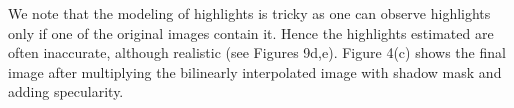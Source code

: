 We note that the modeling of highlights is tricky as one can observe highlights
only if one of the original images contain it. Hence the highlights estimated
are often inaccurate, although realistic (see Figures 9d,e). Figure 4(c) shows
the final image after multiplying the bilinearly interpolated image with shadow
mask and adding specularity.

\begin{figure}[t]
\centering {} 
\end{figure}

